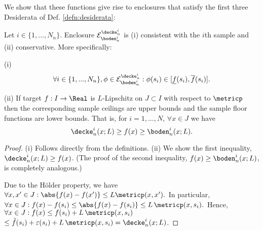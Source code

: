 We show that these functions give rise to enclosures that satisfy the first three Desiderata of Def. \ref{defn:desiderata}:
\begin{lem} 
\label{lem:samplefloorceiling}
Let  $i \in \{1,...,N_n\}$.
Enclosure $\mathcal E^{\decke_n^i}_{\boden_n^i}$ is (i) consistent with the $i$th sample and (ii) conservative. 
More specifically: 

(i)  \[\forall i \in \{1,...,N_n\}, \phi \in \mathcal E^{\decke_n^i}_{\boden_n^i}:  \phi(s_i) \in [\underline f(s_i), \overline f(s_i)].\]

(ii) If target $f: I \to \Real$ is $L$-Lipschitz on $J \subset I$ with respect to $\metricp$ then the corresponding sample ceilings are upper bounds and the sample floor functions are lower bounds. That is, for $i =1,\ldots, N$, $\forall x \in J$ we have \[\decke_n^i (x; L) \geq f(x)  \geq  \boden_n^i (x; L).\]

\begin{proof}
(i) Follows directly from the definitions.
(ii) We show the first inequality, $\decke_n^i (x; L) \geq f(x)$. (The proof of the second inequality,  $f(x)  \geq  \boden_n^i (x; L)$, is completely analogous.) 

Due to the H\"older property, we have 
$\forall x,x' \in J: \abs{f(x) - f(x')} \leq L \metricp(x,x').$
In particular, 
$\forall x \in J: f(x) - f(s_i) \leq\abs{f(x) - f(s_i)} \leq L \, \metricp(x, s_i).$
Hence, 
$\forall x \in J: f(x)  \leq f(s_i) + L \, \metricp(x, s_i)$ 
$\leq \tilde f(s_i) +\varepsilon(s_i) + L \, \metricp(x, s_i) = \decke_n^i (x; L)$.





\end{proof}
\end{lem}



